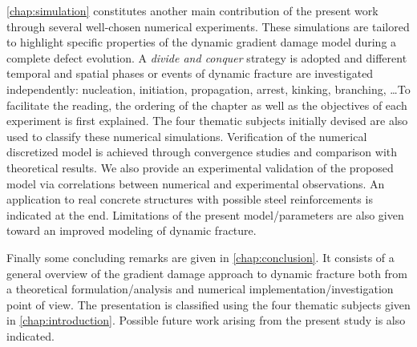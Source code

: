 \cref{chap:simulation} constitutes another main contribution of the present work through several well-chosen numerical experiments. These simulations are tailored to highlight specific properties of the dynamic gradient damage model during a complete defect evolution. A \emph{divide and conquer} strategy is adopted and different temporal and spatial phases or events of dynamic fracture are investigated independently: nucleation, initiation, propagation, arrest, kinking, branching, \ldots To facilitate the reading, the ordering of the chapter as well as the objectives of each experiment is first explained. The four thematic subjects initially devised are also used to classify these numerical simulations. Verification of the numerical discretized model is achieved through convergence studies and comparison with theoretical results. We also provide an experimental validation of the proposed model via correlations between numerical and experimental observations. An application to real concrete structures with possible steel reinforcements is indicated at the end. Limitations of the present model/parameters are also given toward an improved modeling of dynamic fracture.

Finally some concluding remarks are given in \cref{chap:conclusion}. It consists of a general overview of the gradient damage approach to dynamic fracture both from a theoretical formulation/analysis and numerical implementation/investigation point of view. The presentation is classified using the four thematic subjects given in \cref{chap:introduction}. Possible future work arising from the present study is also indicated. 

